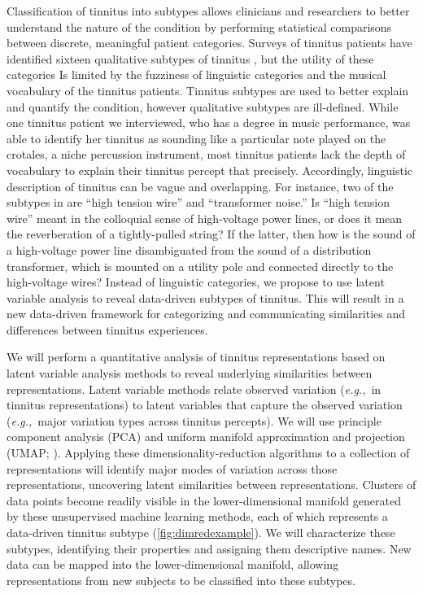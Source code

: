\documentclass[11pt, notitlepage]{article} %
\def\eg{{\emph{e.g.,}}~}
\begin{document}
Classification of tinnitus into subtypes allows clinicians
and researchers to better understand the nature of the condition
by performing statistical comparisons between discrete, meaningful patient categories.
Surveys of tinnitus patients have identified sixteen qualitative subtypes of tinnitus
\cite{vajsakovicPrinciplesMethodsPsychoacoustic2021,meikleTinnitusArchiveArchive2004,stoufferCharacterizationTinnitusTinnitus1990},
but the utility of these categories Is limited by the fuzziness of linguistic categories and the musical vocabulary of the tinnitus patients.
Tinnitus subtypes are used to better explain and quantify the condition,
however qualitative subtypes are ill-defined.
While one tinnitus patient we interviewed, who has a degree in music performance,
was able to identify her tinnitus as sounding like a particular note played on the crotales,
a niche percussion instrument,
most tinnitus patients lack the depth of vocabulary to explain their tinnitus percept that precisely.
Accordingly, linguistic description of tinnitus can be vague and overlapping.
For instance, two of the subtypes in \cite{vajsakovicPrinciplesMethodsPsychoacoustic2021} are ``high tension wire'' and ``transformer noise.''
Is ``high tension wire'' meant in the colloquial sense of high-voltage power lines,
or does it mean the reverberation of a tightly-pulled string?
If the latter, then how is the sound of a high-voltage power line
disambiguated from the sound of a distribution transformer,
which is
mounted on a utility pole and connected directly to the high-voltage wires?
Instead of linguistic categories, we propose to use latent variable analysis
to reveal data-driven subtypes of tinnitus.
This will result in a new data-driven framework for categorizing and communicating
similarities and differences between tinnitus experiences.

We will perform a quantitative analysis of tinnitus representations based on latent variable analysis methods
to reveal underlying similarities between representations.
Latent variable methods relate observed variation (\eg in tinnitus representations)
to latent variables that capture the observed variation (\eg major variation types across tinnitus percepts).
We will use principle component analysis (PCA) and uniform manifold approximation and projection (UMAP; \cite{mcinnesUMAPUniformManifold2020}).
Applying these dimensionality-reduction algorithms to a collection of representations
will identify major modes of variation across those representations,
uncovering latent similarities between representations.
Clusters of data points become readily visible in the lower-dimensional manifold generated
by these unsupervised machine learning methods, each of which represents
a data-driven tinnitus subtype (\autoref{fig:dimredexample}).
We will characterize these subtypes, identifying their properties and assigning them descriptive names.
New data can be mapped into the lower-dimensional manifold,
allowing representations from new subjects to be classified into these subtypes.
\end{document}
